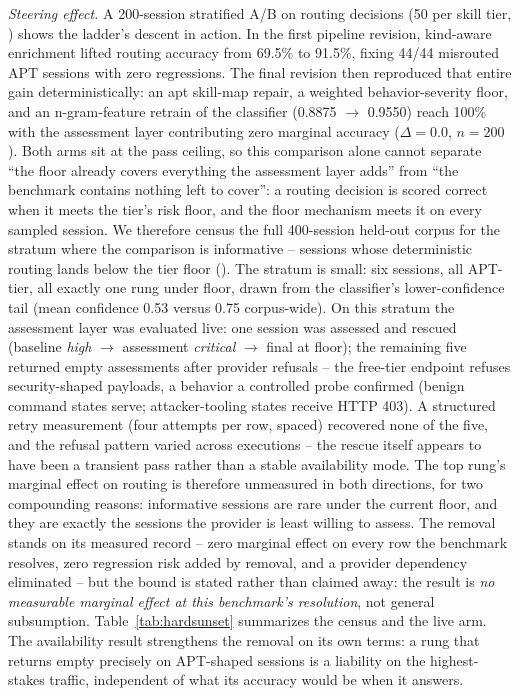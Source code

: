 \emph{Steering effect.} A 200-session stratified A/B on routing decisions
(50 per skill tier, ) shows the ladder's descent
in action. In the first pipeline revision, kind-aware enrichment lifted
routing accuracy from 69.5\% to 91.5\%, fixing 44/44 misrouted APT
sessions with zero regressions. The final revision then reproduced that
entire gain deterministically: an apt skill-map repair, a weighted
behavior-severity floor, and an n-gram-feature retrain of the classifier
(0.8875 $\to$ 0.9550) reach 100\% with the assessment layer contributing
zero marginal accuracy ($\Delta = 0.0$, $n=200$). Both arms sit at the
pass ceiling, so this comparison alone cannot separate ``the floor
already covers everything the assessment layer adds'' from ``the
benchmark contains nothing left to cover'': a routing decision is scored
correct when it meets the tier's risk floor, and the floor mechanism
meets it on every sampled session. We therefore census the full
400-session held-out corpus for the stratum where the comparison is
informative -- sessions whose deterministic routing lands below the tier
floor (). The stratum is small: six sessions,
all APT-tier, all exactly one rung under floor, drawn from the
classifier's lower-confidence tail (mean confidence 0.53 versus 0.75
corpus-wide). On this stratum the assessment layer was evaluated live:
one session was assessed and rescued (baseline \emph{high} $\to$
assessment \emph{critical} $\to$ final at floor); the remaining five
returned empty assessments after provider refusals -- the free-tier
endpoint refuses security-shaped payloads, a behavior a controlled
probe confirmed (benign command states serve; attacker-tooling states
receive HTTP 403). A structured retry measurement (four attempts per
row, spaced) recovered none of the five, and the refusal pattern
varied across executions -- the rescue itself appears to have been a
transient pass rather than a stable availability mode. The top rung's marginal
effect on routing is therefore unmeasured in both directions, for two
compounding reasons: informative sessions are rare under the current
floor, and they are exactly the sessions the provider is least willing
to assess. The removal stands on its measured record -- zero marginal
effect on every row the benchmark resolves, zero regression risk added
by removal, and a provider dependency eliminated -- but the bound is
stated rather than claimed away: the result is \emph{no measurable
marginal effect at this benchmark's resolution}, not general subsumption.
Table~\ref{tab:hardsunset} summarizes the census and the live arm.
The availability result strengthens the removal on its own terms: a
rung that returns empty precisely on APT-shaped sessions is a liability
on the highest-stakes traffic, independent of what its accuracy would
be when it answers.

